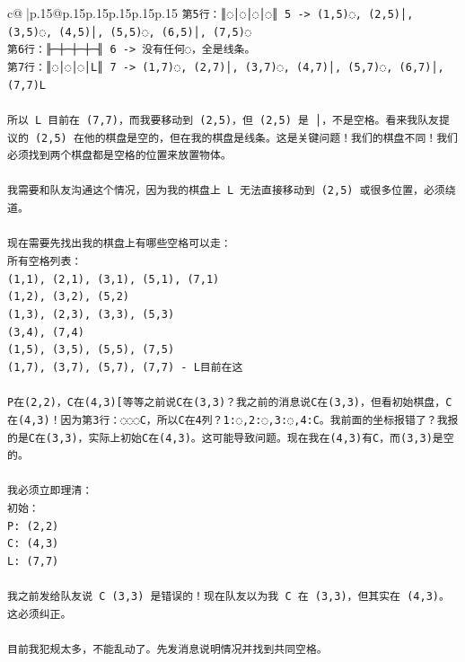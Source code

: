 \documentclass{article}
\begin{document}
{\begin{supertabular}{c@{$\;$}|p{.15\linewidth}@{}p{.15\linewidth}p{.15\linewidth}p{.15\linewidth}p{.15\linewidth}p{.15\linewidth}}
{{{\texttt{第5行：║◌│◌│◌│◌║ 5 {-}> (1,5)◌, (2,5)│, (3,5)◌, (4,5)│, (5,5)◌, (6,5)│, (7,5)◌} \\
\texttt{第6行：╟─┼─┼─┼─╢ 6 {-}> 没有任何◌，全是线条。} \\
\texttt{第7行：║◌│◌│◌│L║ 7 {-}> (1,7)◌, (2,7)│, (3,7)◌, (4,7)│, (5,7)◌, (6,7)│, (7,7)L} \\
\\ 
\texttt{所以 L 目前在 (7,7)，而我要移动到 (2,5)，但 (2,5) 是 │，不是空格。看来我队友提议的 (2,5) 在他的棋盘是空的，但在我的棋盘是线条。这是关键问题！我们的棋盘不同！我们必须找到两个棋盘都是空格的位置来放置物体。} \\
\\ 
\texttt{我需要和队友沟通这个情况，因为我的棋盘上 L 无法直接移动到 (2,5) 或很多位置，必须绕道。} \\
\\ 
\texttt{现在需要先找出我的棋盘上有哪些空格可以走：} \\
\texttt{所有空格列表：} \\
\texttt{(1,1), (2,1), (3,1), (5,1), (7,1)} \\
\texttt{(1,2), (3,2), (5,2)} \\
\texttt{(1,3), (2,3), (3,3), (5,3)} \\
\texttt{(3,4), (7,4)} \\
\texttt{(1,5), (3,5), (5,5), (7,5)} \\
\texttt{(1,7), (3,7), (5,7), (7,7) {-} L目前在这} \\
\\ 
\texttt{P在(2,2)，C在(4,3){[}等等之前说C在(3,3)？我之前的消息说C在(3,3)，但看初始棋盘，C在(4,3)！因为第3行：◌◌◌C，所以C在4列？1:◌,2:◌,3:◌,4:C。我前面的坐标报错了？我报的是C在(3,3)，实际上初始C在(4,3)。这可能导致问题。现在我在(4,3)有C，而(3,3)是空的。} \\
\\ 
\texttt{我必须立即理清：} \\
\texttt{初始：} \\
\texttt{P: (2,2)} \\
\texttt{C: (4,3)} \\
\texttt{L: (7,7)} \\
\\ 
\texttt{我之前发给队友说 C (3,3) 是错误的！现在队友以为我 C 在 (3,3)，但其实在 (4,3)。这必须纠正。} \\
\\ 
\texttt{目前我犯规太多，不能乱动了。先发消息说明情况并找到共同空格。} \\
\\ 
}}}
\end{supertabular}}
\end{document}
